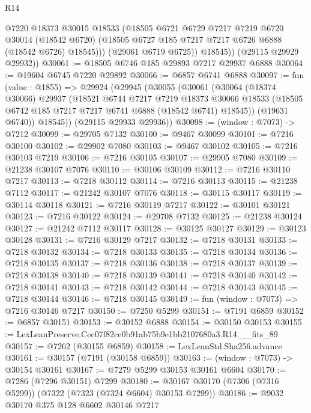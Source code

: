 \begin{lexlean}{R14}
\begin{coremodule}
              @7220
              @18373
              @30015
              @18533
              (@18505
                @6721
                @6729
                @7217
                @7219
                @6720
                @30014
                (@18542 @6720)
                (@18505 @6727 @185 @7217 @7217 @6726 @6888 (@18542 @6726) @18545)))
            (@29061 @6719 @6725))
          @18545))
      (@29115 @29929 @29932))
@30061 := @18505 @6746 @185 @29893 @7217 @29937 @6888
@30064 := @19604 @6745 @7220 @29892
@30066 := @6857 @6741 @6888
@30097 := fun (value : @1855) =>
  @29924
    (@29945
      (@30055
        (@30061
          (@30064
            (@18374 @30066)
            @29937
            (@18521
              @6744
              @7217
              @7219
              @18373
              @30066
              @18533
              (@18505 @6742 @185 @7217 @7217 @6741 @6888 (@18542 @6741) @18545))
            (@19631 @6740))
          @18545))
      (@29115 @29933 @29936))
@30098 := (window : @7073) -> @7212
@30099 := @29705 @7132
@30100 := @9467 @30099
@30101 := @7216 @30100
@30102 := @29902 @7080
@30103 := @9467 @30102
@30105 := @7216 @30103 @7219
@30106 := @7216 @30105
@30107 := @29905 @7080
@30109 := @21238 @30107 @7076
@30110 := @30106 @30109
@30112 := @7216 @30110 @7217
@30113 := @7218 @30112
@30114 := @7216 @30113
@30115 := @21238 @7112
@30117 := @21242 @30107 @7076
@30118 := @30115 @30117
@30119 := @30114 @30118
@30121 := @7216 @30119 @7217
@30122 := @30101 @30121
@30123 := @7216 @30122
@30124 := @29708 @7132
@30125 := @21238 @30124
@30127 := @21242 @7112 @30117
@30128 := @30125 @30127
@30129 := @30123 @30128
@30131 := @7216 @30129 @7217
@30132 := @7218 @30131
@30133 := @7218 @30132
@30134 := @7218 @30133
@30135 := @7218 @30134
@30136 := @7218 @30135
@30137 := @7218 @30136
@30138 := @7218 @30137
@30139 := @7218 @30138
@30140 := @7218 @30139
@30141 := @7218 @30140
@30142 := @7218 @30141
@30143 := @7218 @30142
@30144 := @7218 @30143
@30145 := @7218 @30144
@30146 := @7218 @30145
@30149 := fun (window : @7073) => @7216 @30146 @7217
@30150 := @7250 @5299
@30151 := @7191 @6859
@30152 := @6857 @30151
@30153 := @30152 @6888
@30154 := @30150 @30153
@30155 := LexLeanPreserve.Cec07f82ce0b91ab75b9e1bb2107680a3.R14.__fits_89
@30157 := @7262 (@30155 @6859)
@30158 := LexLeanStd.Sha256.advance
@30161 := @30157 (@7191 (@30158 @6859))
@30163 := (window : @7073) -> @30154 @30161
@30167 := @7279 @5299 @30153 @30161 @6604
@30170 := @7286 (@7296 @30151) @7299
@30180 := @30167 @30170 (@7306 (@7316 @5299)) (@7322 (@7323 (@7324 @6604) @30153 @7299))
@30186 := @9032 @30170 @375 @128 @6602 @30146 @7217

\end{coremodule}
\end{lexlean}
